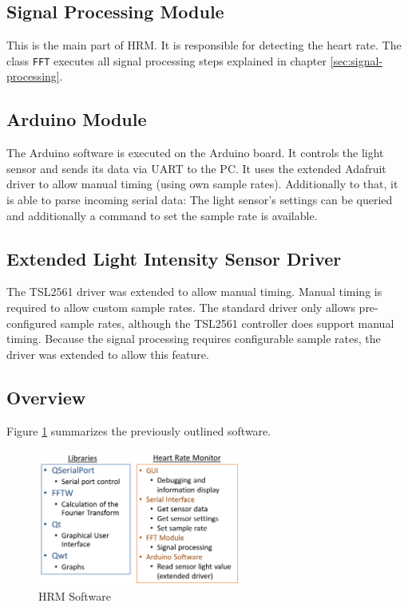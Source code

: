 \documentclass[notitlepage]{scrreprt}
\begin{document}
\subsection{Signal Processing Module}
This is the main part of HRM. It is responsible for detecting the heart rate. The class \lstinline{FFT} executes all signal processing steps explained in chapter \ref{sec:signal-processing}.

\subsection{Arduino Module}
The Arduino software is executed on the Arduino board. It controls the light sensor and sends its data via UART to the PC. It uses the extended Adafruit driver to allow manual timing (using own sample rates). Additionally to that, it is able to parse incoming serial data: The light sensor's settings can be queried and additionally a command to set the sample rate is available.

\newpage

\subsection{Extended Light Intensity Sensor Driver}
The TSL2561 driver was extended to allow manual timing. Manual timing is required to allow custom sample rates. The standard driver only allows pre-configured sample rates, although the TSL2561 controller does support manual timing. Because the signal processing requires configurable sample rates, the driver was extended to allow this feature.\\

\subsection{Overview}
Figure \ref{fig:software} summarizes the previously outlined software.

\begin{figure}[H]
	\centering
	\includegraphics[width=250px]{images/software.png}
	\caption{HRM Software}
	\label{fig:software}
\end{figure}
\end{document}

